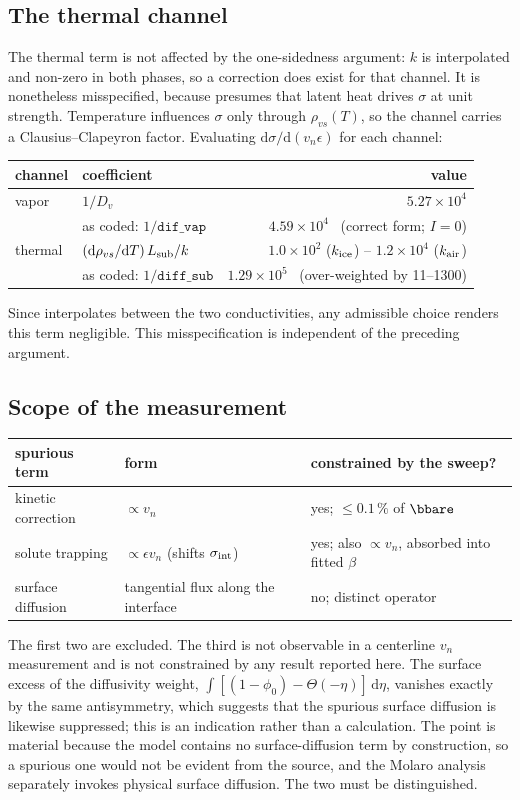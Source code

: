 \subsection{The thermal channel}
The thermal term is not affected by the one-sidedness argument: $k$ is interpolated and
non-zero in both phases, so a correction does exist for that channel. It is nonetheless
misspecified, because  presumes that latent heat drives $\sigma$ at
unit strength. Temperature influences $\sigma$ only through $\rho_{vs}(T)$, so the channel
carries a Clausius--Clapeyron factor. Evaluating
$\mathrm{d}\sigma/\mathrm{d}(v_n\epsilon)$ for each channel:
\begin{center}\small\begin{tabular}{llr}\toprule
channel & coefficient & value\\ \midrule
vapor & $1/D_v$ & $5.27\times10^{4}$\\
      & as coded: $1/\texttt{dif\_vap}$ & $4.59\times10^{4}$ \ (correct form; $I=0$)\\[2pt]
thermal & $(\mathrm{d}\rho_{vs}/\mathrm{d}T)\,L_{\rm sub}/k$ & $1.0\times10^{2}$ ($k_{\rm ice}$) -- $1.2\times10^{4}$ ($k_{\rm air}$)\\
        & as coded: $1/\texttt{diff\_sub}$ & $1.29\times10^{5}$ \ (over-weighted by 11--1300)\\ \bottomrule
\end{tabular}\end{center}
Since  interpolates between the two conductivities, any admissible choice
renders this term negligible. This misspecification is independent of the preceding
argument.

\subsection{Scope of the measurement}
\begin{center}\small\begin{tabular}{lll}\toprule
spurious term & form & constrained by the sweep?\\ \midrule
kinetic correction & $\propto v_n$ & yes; $\le0.1\,\%$ of $\bbare$\\
solute trapping & $\propto\epsilon v_n$ (shifts $\sigma_{\rm int}$) & yes; also $\propto v_n$, absorbed into fitted $\beta$\\
surface diffusion & tangential flux along the interface & no; distinct operator\\ \bottomrule
\end{tabular}\end{center}
The first two are excluded. The third is not observable in a centerline $v_n$ measurement
and is not constrained by any result reported here. The surface excess of the diffusivity
weight, $\int[(1-\phi_0)-\Theta(-\eta)]\,\mathrm{d}\eta$, vanishes exactly by the same
antisymmetry, which suggests that the spurious surface diffusion is likewise suppressed;
this is an indication rather than a calculation. The point is material because the model
contains no surface-diffusion term by construction, so a spurious one would not be evident
from the source, and the Molaro analysis separately invokes physical surface diffusion.
The two must be distinguished.
